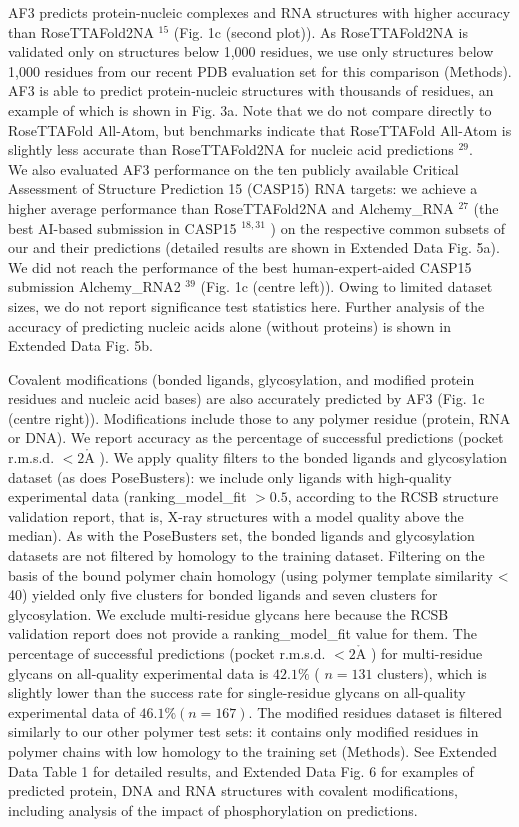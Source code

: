 \documentclass[10pt]{article}
\def\AA{\mathring{\mathrm{A}}}
\begin{document}
AF3 predicts protein-nucleic complexes and RNA structures with higher accuracy than RoseTTAFold2NA ${ }^{15}$ (Fig. 1c (second plot)). As RoseTTAFold2NA is validated only on structures below 1,000 residues, we use only structures below 1,000 residues from our recent PDB evaluation set for this comparison (Methods). AF3 is able to predict protein-nucleic structures with thousands of residues, an example of which is shown in Fig. 3a. Note that we do not compare directly to RoseTTAFold All-Atom, but benchmarks indicate that RoseTTAFold All-Atom is slightly less accurate than RoseTTAFold2NA for nucleic acid predictions ${ }^{29}$.\\
We also evaluated AF3 performance on the ten publicly available Critical Assessment of Structure Prediction 15 (CASP15) RNA targets: we achieve a higher average performance than RoseTTAFold2NA and Alchemy\_RNA ${ }^{27}$ (the best AI-based submission in CASP15 ${ }^{18,31}$ ) on the respective common subsets of our and their predictions (detailed results are shown in Extended Data Fig. 5a). We did not reach the performance of the best human-expert-aided CASP15 submission Alchemy\_RNA2 ${ }^{39}$ (Fig. 1c (centre left)). Owing to limited dataset sizes, we do not report significance test statistics here. Further analysis of the accuracy of predicting nucleic acids alone (without proteins) is shown in Extended Data Fig. 5b.

Covalent modifications (bonded ligands, glycosylation, and modified protein residues and nucleic acid bases) are also accurately predicted by AF3 (Fig. 1c (centre right)). Modifications include those to any polymer residue (protein, RNA or DNA). We report accuracy as the percentage of successful predictions (pocket r.m.s.d. $<2 \AA$ ). We apply quality filters to the bonded ligands and glycosylation dataset (as does PoseBusters): we include only ligands with high-quality experimental data (ranking\_model\_fit $>0.5$, according to the RCSB structure validation report, that is, X-ray structures with a model quality above the median). As with the PoseBusters set, the bonded ligands and glycosylation datasets are not filtered by homology to the training dataset. Filtering on the basis of the bound polymer chain homology (using polymer template similarity < 40) yielded only five clusters for bonded ligands and seven clusters for glycosylation. We exclude multi-residue glycans here because the RCSB validation report does not provide a ranking\_model\_fit value for them. The percentage of successful predictions (pocket r.m.s.d. $<2 \AA$ ) for multi-residue glycans on all-quality experimental data is $42.1 \%$ ( $n=131$ clusters), which is slightly lower than the success rate for single-residue glycans on all-quality experimental data of $46.1 \%(n=167)$. The modified residues dataset is filtered similarly to our other polymer test sets: it contains only modified residues in polymer chains with low homology to the training set (Methods). See Extended Data Table 1 for detailed results, and Extended Data Fig. 6 for examples of predicted protein, DNA and RNA structures with covalent modifications, including analysis of the impact of phosphorylation on predictions.
\end{document}
